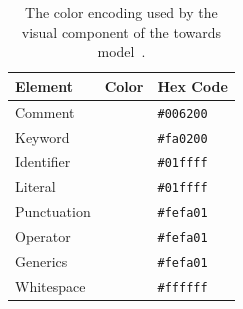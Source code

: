 \documentclass[%
class=scrreprt,
chapterprefix=false,%
open=right,%
twoside=false,%
paper=a4,%
logofile={Logo\_zentral\_farbig\_EN.png},%
thesistype=master,%
UKenglish,%
]{se2thesis}
\theoremstyle{definition}
\begin{document}
	\begin{table}[tb]
		\centering
		\caption{The color encoding used by the visual component of the towards model~\cite{mi2022towards}.}
		\label{tab:model-colors}
		\begin{tabular}{lll}
			\toprule
			Element & Color & Hex Code \\
			\midrule
			Comment & \cellcolor{CommentColor} & \texttt{\#006200} \\
			Keyword & \cellcolor{KeywordColor} & \texttt{\#fa0200} \\
			Identifier & \cellcolor{IdentifierColor} & \texttt{\#01ffff} \\
			Literal & \cellcolor{LiteralColor} & \texttt{\#01ffff} \\
			Punctuation & \cellcolor{PunctuationColor} & \texttt{\#fefa01} \\
			Operator & \cellcolor{OperatorColor} & \texttt{\#fefa01} \\
			Generics & \cellcolor{GenericsColor} & \texttt{\#fefa01} \\
			Whitespace & \cellcolor{WhitespaceColor} & \texttt{\#ffffff} \\
			\bottomrule
		\end{tabular}
	\end{table}
	
%	
	
\end{document}
